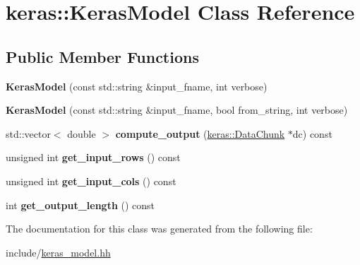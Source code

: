 \hypertarget{classkeras_1_1_keras_model}{}\section{keras\+:\+:Keras\+Model Class Reference}
\label{classkeras_1_1_keras_model}
\subsection*{Public Member Functions}
\begin{DoxyCompactItemize}
\item 
\mbox{\label{classkeras_1_1_keras_model_a993a61d91da66f945265d5b960a24ccd}} 
{\bfseries Keras\+Model} (const std\+::string \&input\+\_\+fname, int verbose)
\item 
\mbox{\label{classkeras_1_1_keras_model_ae9440b0e19b80eca1ef75bd0d6170f77}} 
{\bfseries Keras\+Model} (const std\+::string \&input\+\_\+fname, bool from\+\_\+string, int verbose)
\item 
\mbox{\label{classkeras_1_1_keras_model_a6a808591a094dfe3d2b343911d9a488a}} 
std\+::vector$<$ double $>$ {\bfseries compute\+\_\+output} (\mbox{\hyperlink{classkeras_1_1_data_chunk}{keras\+::\+Data\+Chunk}} $\ast$dc) const
\item 
\mbox{\label{classkeras_1_1_keras_model_a6132e31054b548fff88e69aeef03ec4f}} 
unsigned int {\bfseries get\+\_\+input\+\_\+rows} () const
\item 
\mbox{\label{classkeras_1_1_keras_model_ac73d49ab290d9a4266fac6366a718d3a}} 
unsigned int {\bfseries get\+\_\+input\+\_\+cols} () const
\item 
\mbox{\label{classkeras_1_1_keras_model_a5c6871678cc6053bfe62ded77400463d}} 
int {\bfseries get\+\_\+output\+\_\+length} () const
\end{DoxyCompactItemize}


The documentation for this class was generated from the following file\+:\begin{DoxyCompactItemize}
\item 
include/\mbox{\hyperlink{keras__model_8hh}{keras\+\_\+model.\+hh}}\end{DoxyCompactItemize}
